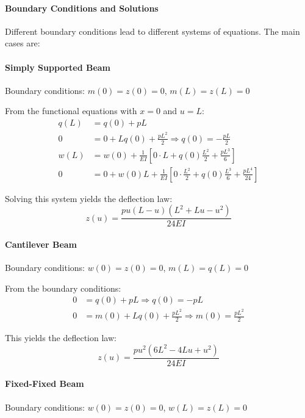 \paragraph{Boundary Conditions and Solutions}
Different boundary conditions lead to different systems of equations. The main cases are:

\paragraph{Simply Supported Beam}
Boundary conditions: $m(0) = z(0) = 0$, $m(L) = z(L) = 0$

From the functional equations with $x = 0$ and $u = L$:
\begin{align}
q(L) &= q(0) + pL \\
0 &= 0 + Lq(0) + \frac{pL^2}{2} \Rightarrow q(0) = -\frac{pL}{2} \\
w(L) &= w(0) + \frac{1}{EI}\left[0 \cdot L + q(0)\frac{L^2}{2} + \frac{pL^3}{6}\right] \\
0 &= 0 + w(0)L + \frac{1}{EI}\left[0 \cdot \frac{L^2}{2} + q(0)\frac{L^3}{6} + \frac{pL^4}{24}\right]
\end{align}

Solving this system yields the deflection law:
\begin{equation}
z(u) = \frac{pu(L-u)(L^2 + Lu - u^2)}{24EI}
\end{equation}

\paragraph{Cantilever Beam}
Boundary conditions: $w(0) = z(0) = 0$, $m(L) = q(L) = 0$

From the boundary conditions:
\begin{align}
0 &= q(0) + pL \Rightarrow q(0) = -pL \\
0 &= m(0) + Lq(0) + \frac{pL^2}{2} \Rightarrow m(0) = \frac{pL^2}{2}
\end{align}

This yields the deflection law:
\begin{equation}
z(u) = \frac{pu^2(6L^2 - 4Lu + u^2)}{24EI}
\end{equation}

\paragraph{Fixed-Fixed Beam}
Boundary conditions: $w(0) = z(0) = 0$, $w(L) = z(L) = 0$


